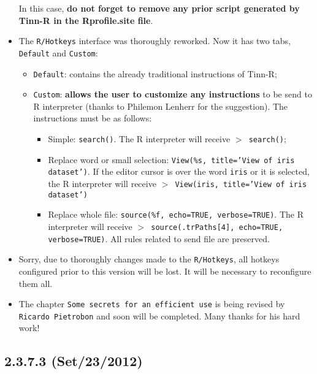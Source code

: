 \begin{itemize}
    In this case, \textbf{do not forget to remove any prior script generated by Tinn-R in the Rprofile.site file}.
  \item The \texttt{R/Hotkeys} interface was thoroughly reworked. Now it has two tabs, \texttt{Default} and \texttt{Custom}:
    \begin{itemize}
      \item \texttt{Default}: contains the already traditional instructions of Tinn-R;
      \item \texttt{Custom}: \textbf{allows the user to customize any instructions} to be send to R interpreter
        (thanks to Philemon Lenherr for the suggestion). The instructions must be as follows:
        \begin{itemize}
          \item Simple: \texttt{search()}. The R interpreter will receive \texttt{$>$ search()};
          \item Replace word or small selection: \texttt{View(\%s, title='View of iris dataset')}.
            If the editor cursor is over the word \texttt{iris} or it is selected,
            the R interpreter will receive \texttt{$>$ View(iris, title='View of iris dataset')}
          \item Replace whole file: \texttt{source(\%f, echo=TRUE, verbose=TRUE)}.
            The R interpreter will receive \texttt{$>$ source(.trPaths[4], echo=TRUE, verbose=TRUE)}.
            All rules related to send file are preserved.
        \end{itemize}
    \end{itemize}
  \item Sorry, due to thoroughly changes made to the \texttt{R/Hotkeys}, all hotkeys configured prior to this version will be lost.
    It will be necessary to reconfigure them all.
  \item The chapter \texttt{Some secrets for an efficient use} is being revised by \texttt{Ricardo Pietrobon} and soon will be completed.
    Many thanks for his hard work!
\end{itemize}

\subsection*{2.3.7.3 (Set/23/2012)}

